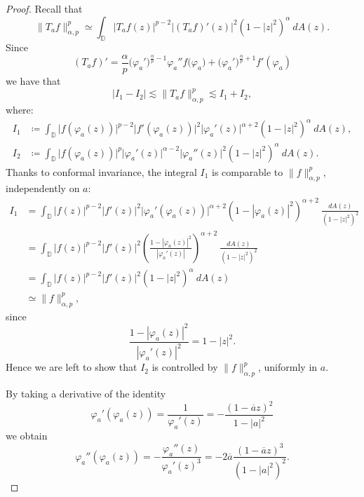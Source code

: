 \documentclass[12pt]{amsart}
\theoremstyle{definition}
\newcommand{\D}{\mathbb{{D}}}
\numberwithin{equation}{section}
\begin{document}
        \begin{proof}
        
            Recall that
                \[
                    \|T_af\|_{\alpha,p}^p \simeq \int_{\D} \big|T_af(z)\big|^{p-2} \big|(T_af)'(z)\big|^2 (1-|z|^2)^{\alpha} ~dA(z).
                \]
                Since
                \[
                    (T_a f)' = \dfrac{\alpha}{p} \big( \varphi_a' \big)^{\frac{\alpha}{p} - 1} \varphi_a'' f \big( \varphi_a ) + \big( \varphi_a' \big)^{\frac{\alpha}{p} + 1} f' (\varphi_a)
                \] 
                we have that $$|I_1-I_2|\lesssim\|T_af\|_{\alpha,p}^p \lesssim I_1 + I_2,$$ where:
                \[
                    \begin{aligned}
                        I_1 & \coloneqq \int_{\D} \big|f(\varphi_a(z))\big|^{p-2}\big|f'(\varphi_a(z))\big|^{2}\big|\varphi_a'(z)\big|^{\alpha+2} (1-|z|^2)^{\alpha}~dA(z),\\
                        I_2 & \coloneqq \int_{\D} \big|f(\varphi_a(z))\big|^{p}\big|\varphi_a'(z)\big|^{\alpha - 2}\big| \varphi_a''(z)\big|^{2} (1-|z|^2)^{\alpha}~dA(z).
                    \end{aligned}
                \]
                Thanks to conformal invariance, the integral $I_1$ is comparable to $\|f\|^p_{\alpha,p}$, independently on $a$:
                \[
                    \begin{aligned}
                        I_1 & = \int_{\D} \big|f(z)\big|^{p-2}\big|f'(z)\big|^{2}\big|\varphi_a'(\varphi_a(z))\big|^{\alpha+2} (1-|\varphi_a(z)|^2)^{\alpha+2}~\frac{dA(z)}{(1-|z|^2)^2} \\
                        & = \int_{\D} \big|f(z)\big|^{p-2}\big|f'(z)\big|^{2} \left(\frac{1 - |\varphi_a(z)|^2}{|\varphi_a'(z)|}\right)^{\alpha+2
                        }~\frac{dA(z)}{(1-|z|^2)^2} \\
                        & = \int_{\D} \big|f(z)\big|^{p-2}\big|f'(z)\big|^{2} (1-|z|^2)^{\alpha}~dA(z) \\
                        & \simeq \|f\|^p_{\alpha,p},
                    \end{aligned}
                \]
                since 
                \[
                    \frac{1-|\varphi_a(z)|^2}{|\varphi_a'(z)|^2}=1-|z|^2.
                \]
                Hence we are left to show that $I_2$ is controlled by $\|f\|^p_{\alpha,p}$, uniformly in $a$. 
            
            By taking a derivative of the identity
                \[
                    \varphi_a'(\varphi_a(z))=\frac{1}{\varphi_a'(z)}=-\frac{(1-\overline az)^2}{1-|a|^2}
                \]
                we obtain
                \[
                    \varphi_a''(\varphi_a(z))=-\frac{\varphi_a''(z)}{\varphi_a'(z)^3}=-2 \overline{a} \frac{(1-\overline az)^3}{(1-|a|^2)^2}.
                \]
            

\end{proof}
\end{document}
